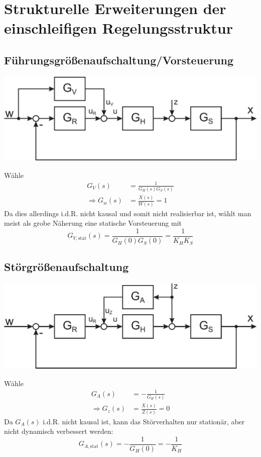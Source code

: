 \documentclass[a4paper,twocolumn,10pt]{article}
\begin{document}
\section{Strukturelle Erweiterungen der einschleifigen Regelungsstruktur}

\subsection{Führungsgrößenaufschaltung/Vorsteuerung}
\begin{center}
\includegraphics[width=0.95\columnwidth]{Grafiken/Vorsteuerung_Regelkreis}
\end{center}
Wähle
\begin{equation*}
\begin{split}
G_V(s)&=\frac{1}{G_H(s)G_S(s)}\\
\Rightarrow G_w(s)&=\frac{X(s)}{W(s)}=1
\end{split}
\end{equation*}
Da dies allerdings i.d.R. nicht kausal und somit nicht realisierbar ist, wählt man meist als grobe Näherung eine statische Vorsteuerung mit
\begin{equation*}
G_{V,\text{stat}}(s)=\frac{1}{G_H(0)G_S(0)}=\frac{1}{K_HK_S}
\end{equation*}

\subsection{Störgrößenaufschaltung}
\begin{center}
\includegraphics[width=0.95\columnwidth]{Grafiken/Stoergroessenaufschaltung_Regelkreis}
\end{center}
Wähle
\begin{equation*}
\begin{split}
G_A(s)&=-\frac{1}{G_H(s)}\\
\Rightarrow G_z(s)&=\frac{X(s)}{Z(s)}=0
\end{split}
\end{equation*}
Da $G_A(s)$ i.d.R. nicht kausal ist, kann das Störverhalten nur stationär, aber nicht dynamisch verbessert werden:
\begin{equation*}
G_{A,\text{stat}}(s)=-\frac{1}{G_H(0)}=-\frac{1}{K_H}
\end{equation*}
\end{document}
